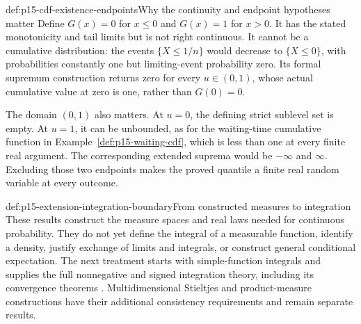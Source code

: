 \begin{hbwarning}{def:p15-cdf-existence-endpoints}{Why the continuity and endpoint hypotheses matter}
Define \(G(x)=0\) for \(x\leq0\) and \(G(x)=1\) for \(x>0\).
It has the stated monotonicity and tail limits but is not right continuous.
It cannot be a cumulative distribution: the events \(\{X\leq1/n\}\)
would decrease to \(\{X\leq0\}\), with probabilities constantly one
but limiting-event probability zero. Its formal supremum construction
returns zero for every \(u\in(0,1)\), whose actual cumulative value
at zero is one, rather than \(G(0)=0\).

The domain \((0,1)\) also matters. At \(u=0\), the defining strict
sublevel set is empty. At \(u=1\), it can be unbounded, as for the
waiting-time cumulative function in
Example~\ref{def:p15-waiting-cdf}, which is less than one at every
finite real argument. The corresponding extended suprema would be
\(-\infty\) and \(\infty\). Excluding those two endpoints makes
the proved quantile a finite real random variable at every outcome.
\end{hbwarning}

\begin{proofboundary}{def:p15-extension-integration-boundary}{From constructed measures to integration}
These results construct the measure spaces and real laws needed for
continuous probability. They do not yet define the integral of a
measurable function, identify a density, justify exchange of limits and
integrals, or construct general conditional expectation. The next
treatment starts with simple-function integrals and supplies the full
nonnegative and signed integration theory, including its convergence
theorems \cite[secs.~1.4--1.6]{DurrettPTEAuthor2019}. Multidimensional
Stieltjes and product-measure constructions have their additional
consistency requirements and remain separate results.
\end{proofboundary}

